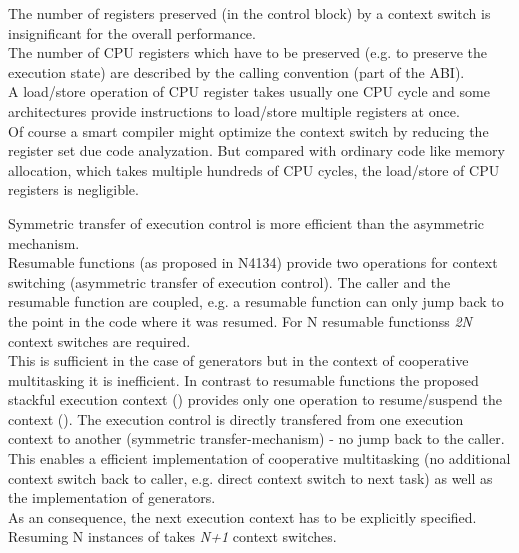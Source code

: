 The number of registers preserved (in the control block) by a context switch is
insignificant for the overall performance.\\
\newline
The number of CPU registers which have to be preserved (e.g. to preserve the
execution state) are described by the calling convention (part of the ABI).\\
A load/store operation of CPU register takes usually one CPU cycle and some
architectures provide instructions to load/store multiple registers at once.\\
Of course a smart compiler might optimize the context switch by reducing the
register set due code analyzation. But compared with ordinary code like memory
allocation, which takes multiple hundreds of CPU cycles, the load/store of
CPU registers is negligible.

Symmetric transfer of execution control is more efficient than the asymmetric
mechanism.\\
\newline
Resumable functions (as proposed in N4134) provide two operations for context
switching (asymmetric transfer of execution control). The caller and the
resumable function are coupled, e.g. a resumable function can only jump back to
the point in the code where it was resumed.
For N resumable functionss \emph{2N} context switches are required.\\
\newline
This is sufficient in the case of generators but in the context of cooperative
multitasking it is inefficient.
In contrast to resumable functions the proposed stackful execution context
(\ectx) provides only one operation to resume/suspend the context (\ectxop). The
execution control is directly transfered from one execution context to another
(symmetric transfer-mechanism) - no jump back to the caller. This enables a
efficient implementation of cooperative multitasking (no additional context
switch back to caller, e.g. direct context switch to next task) as well as the
implementation of generators.\\
As an consequence, the next execution context has to be explicitly specified.\\
\newline
{}
Resuming N instances of \ectx takes \emph{N+1} context switches.

